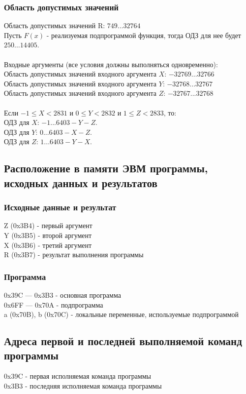 \subsubsection{Область допустимых значений}
\noindent Область допустимых значений R: $749\ldots32764$\\
Пусть $ F(x) $ - реализуемая подпрограммой функция, тогда ОДЗ для нее будет $250\ldots14405$.\\
\\
Входные аргументы (все условия должны выполняться одновременно):\\
Область допустимых значений входного аргумента $ X $: $ -32769...32766 $\\
Область допустимых значений входного аргумента $ Y $: $ -32768...32767 $\\
Область допустимых значений входного аргумента $ Z $: $ -32767...32768 $\\
\\
Если $-1 \leq X < 2831$ и $0 \leq Y < 2832 $ и $1 \leq Z < 2833$, то:\\
\noindent ОДЗ для $ X $: $ -1...6403-Y-Z $.\\
\noindent ОДЗ для $ Y $: $ 0...6403-X-Z $.\\
\noindent ОДЗ для $ Z $: $ 1...6403-Y-X $.\\

\subsection{Расположение в памяти ЭВМ программы, исходных данных и результатов}
\subsubsection{Исходные данные и результат}
\noindent Z (0x3B4) - первый аргумент\\
Y (0x3B5) - второй аргумент\\
X (0x3B6) - третий аргумент\\
R (0x3B7) - результат выполнения программы

\subsubsection{Программа}
\noindent 0x39C --- 0x3B3 - основная программа\\
0x6FF --- 0x70A - подпрограмма\\
a (0x70B), b (0x70C) - локальные переменные, используемые подпрограммой

\subsection{Адреса первой и последней выполняемой команд программы}
\noindent 0x39C - первая исполняемая команда программы\\
0x3B3 - последняя исполняемая команда программы

